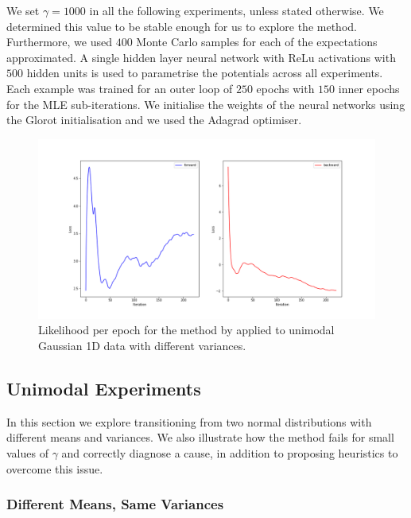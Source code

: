 \documentclass[a4paper,12pt,twoside,openright]{report}
\theoremstyle{definition}
\begin{document}
We set $\gamma=1000$ in all the following experiments, unless stated otherwise. We determined this value to be stable enough for us to explore the method. Furthermore, we used $400$ Monte Carlo  samples for each of the expectations approximated. A single hidden layer neural network \citep{lecun2015deep} with ReLu activations \citep{glorot2011deep} with $500$ hidden units is used to parametrise the potentials across all experiments. Each example was trained for an outer loop of $250$ epochs with $150$ inner epochs for the MLE sub-iterations. We initialise the weights of the neural networks using the Glorot initialisation \citep{glorot2010understanding} and we used the Adagrad \citep{duchi2011adaptive} optimiser.
\begin{figure}
    \centering
    \includegraphics[scale=0.4,trim={2.3cm 1cm 2.5cm 0}, clip]{images/Pavon/pavon convergence big var.png} \vspace{-0.6cm}
    \caption{Likelihood per epoch for the method by \cite{pavon2018data} applied to unimodal Gaussian 1D data with different variances. }
    \label{fig:small_to_big_convergence}
\end{figure}
\subsection{Unimodal Experiments}

In this section we explore transitioning from two normal distributions with different means and variances. We also illustrate how the method fails for small values of $\gamma$ and correctly diagnose a cause, in addition to proposing heuristics to overcome this issue. 
\subsubsection{Different Means, Same Variances}
\end{document}
